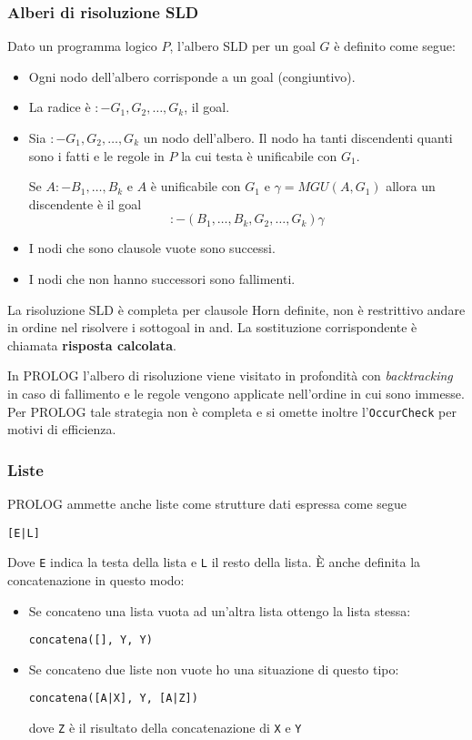 \subsubsection{Alberi di risoluzione SLD}
Dato un programma logico $P$, l'albero SLD per un goal $G$ \`e definito come segue:
\begin{itemize}
	\item Ogni nodo dell'albero corrisponde a un goal (congiuntivo).
	\item La radice \`e $:- G_1, G_2, \dots, G_k$, il goal.
	\item Sia $:- G_1, G_2, \dots, G_k$ un nodo dell'albero. Il nodo ha tanti discendenti quanti sono i fatti e le
	      regole in $P$ la cui testa \`e unificabile con $G_1$.

	      Se $A :- B_1, \dots, B_k$ e $A$ \`e unificabile con $G_1$ e $\gamma = MGU(A, G_1)$ allora un discendente \`e
	      il goal
	      \[ :- (B_1, \dots, B_k, G_2, \dots, G_k) \gamma \]
	\item I nodi che sono clausole vuote sono successi.
	\item I nodi che non hanno successori sono fallimenti.
\end{itemize}
La risoluzione SLD \`e completa per clausole Horn definite, non \`e restrittivo andare in ordine nel risolvere i
sottogoal in and. La sostituzione corrispondente \`e chiamata \textbf{risposta calcolata}.

In PROLOG l'albero di risoluzione viene visitato in profondit\`a con \emph{backtracking} in caso di fallimento e le
regole vengono applicate nell'ordine in cui sono immesse. Per PROLOG tale strategia non \`e completa e si omette inoltre
l'\verb|OccurCheck| per motivi di efficienza.

\subsubsection{Liste}
PROLOG ammette anche liste come strutture dati espressa come segue
\begin{center}
	\texttt{[E|L]}
\end{center}
Dove \verb|E| indica la testa della lista e \verb|L| il resto della lista. \`E anche definita la concatenazione in questo
modo:
\begin{itemize}
	\item Se concateno una lista vuota ad un'altra lista ottengo la lista stessa:
	      \begin{center}
		      \verb|concatena([], Y, Y)|
	      \end{center}
	\item Se concateno due liste non vuote ho una situazione di questo tipo:
	      \begin{center}
		      \texttt{concatena([A|X], Y, [A|Z])}
	      \end{center}
	      dove \verb|Z| \`e il risultato della concatenazione di \verb|X| e \verb|Y|
\end{itemize}

